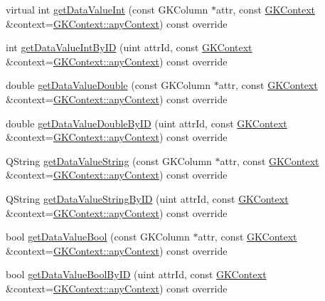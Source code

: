 \begin{DoxyCompactItemize}
virtual int \hyperlink{classGKObject_a1a19168a7f85db37554ae5632a5e89a5}{get\+Data\+Value\+Int} (const G\+K\+Column $\ast$attr, const \hyperlink{classGKContext}{G\+K\+Context} \&context=\hyperlink{classGKContext_a37de2dc1b6bab087b9b92a445922e79d}{G\+K\+Context\+::any\+Context}) const override
\item 
int \hyperlink{classGKObject_a89b17b6bc62ca3f144e25fd637308cf0}{get\+Data\+Value\+Int\+By\+ID} (uint attr\+Id, const \hyperlink{classGKContext}{G\+K\+Context} \&context=\hyperlink{classGKContext_a37de2dc1b6bab087b9b92a445922e79d}{G\+K\+Context\+::any\+Context}) const override
\item 
double \hyperlink{classGKObject_a5f2d6ea14b11d42dee9d7e795dcb9370}{get\+Data\+Value\+Double} (const G\+K\+Column $\ast$attr, const \hyperlink{classGKContext}{G\+K\+Context} \&context=\hyperlink{classGKContext_a37de2dc1b6bab087b9b92a445922e79d}{G\+K\+Context\+::any\+Context}) const override
\item 
double \hyperlink{classGKObject_a62e8d9c7d663027ba49d778145cd9705}{get\+Data\+Value\+Double\+By\+ID} (uint attr\+Id, const \hyperlink{classGKContext}{G\+K\+Context} \&context=\hyperlink{classGKContext_a37de2dc1b6bab087b9b92a445922e79d}{G\+K\+Context\+::any\+Context}) const override
\item 
Q\+String \hyperlink{classGKObject_ab7ea66283fe3a7732da043262dff51e2}{get\+Data\+Value\+String} (const G\+K\+Column $\ast$attr, const \hyperlink{classGKContext}{G\+K\+Context} \&context=\hyperlink{classGKContext_a37de2dc1b6bab087b9b92a445922e79d}{G\+K\+Context\+::any\+Context}) const override
\item 
Q\+String \hyperlink{classGKObject_a6eabd8c4b25fb20094d075d986e94015}{get\+Data\+Value\+String\+By\+ID} (uint attr\+Id, const \hyperlink{classGKContext}{G\+K\+Context} \&context=\hyperlink{classGKContext_a37de2dc1b6bab087b9b92a445922e79d}{G\+K\+Context\+::any\+Context}) const override
\item 
bool \hyperlink{classGKObject_a7f84545d868c53f65e6df09a8ca10f75}{get\+Data\+Value\+Bool} (const G\+K\+Column $\ast$attr, const \hyperlink{classGKContext}{G\+K\+Context} \&context=\hyperlink{classGKContext_a37de2dc1b6bab087b9b92a445922e79d}{G\+K\+Context\+::any\+Context}) const override
\item 
bool \hyperlink{classGKObject_a390a8acd3245bf70bda684b93021bf32}{get\+Data\+Value\+Bool\+By\+ID} (uint attr\+Id, const \hyperlink{classGKContext}{G\+K\+Context} \&context=\hyperlink{classGKContext_a37de2dc1b6bab087b9b92a445922e79d}{G\+K\+Context\+::any\+Context}) const override

\end{DoxyCompactItemize}
